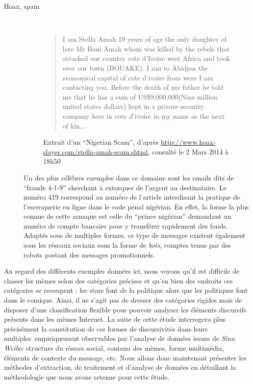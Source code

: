 \begin{description}
\item[Hoax, spam]
\hfill \\
\begin{figure}[ht]
    \begin{quote}
        I am Stella Amah 19 years of age the only daughter of late Mr Boni Amah whom was killed by the rebels that attacked our country cote d'Ivoire west Africa and took over our town (BOUAKE). I ran to Abidjan the economical capital of cote d'ivoire from were I am contacting you. Before the death of my father he told me that he has a sum of US\$9,000,000(Nine million united states dollars) kept in a private security company here in cote d'ivoire in my name as the next of kin... 
    \end{quote}
    \caption[Extrait d'un spam du type \textit{Nigerian Scam}]{
        Extrait d{\textquoteright}un {\textquotedblleft}Nigerian Scam{\textquotedblright}, d{\textquoteright}apr\`es \url{http://www.hoax-slayer.com/stella-amah-scam.shtml,} consult\'e le 2 Mars 2014 \`a 18h50
    }
    \label{fig:nigerian-scam}
\end{figure}

Un des plus c\'el\`ebres exemples dans ce domaine sont les emails dits de {\textquotedblleft}fraude 4-1-9{\textquotedblright} cherchant \`a extorquer de l{\textquoteright}argent au destinataire. Le num\'ero 419 correspond au num\'ero de l{\textquoteright}article interdisant la pratique de l{\textquoteright}escroquerie en ligne dans le code p\'enal nig\'erian. En effet, la forme la plus connue de cette arnaque est celle du {\textquotedblleft}prince nig\'erian{\textquotedblright} demandant un num\'ero de compte bancaire pour y transf\'erer rapidement des fonds. Adapt\'es sous de multiples formes, ce type de messages existent \'egalement sous les r\'eseaux sociaux sous la forme de \textit{bots}, comptes tenus par des robots postant des messages promotionnels.  


\end{description}

Au regard des diff\'erents exemples donn\'ees ici, nous voyons qu{\textquoteright}il est difficile de classer les m\`emes selon des cat\'egories pr\'ecises et qu{\textquoteright}en bien des endroits ces cat\'egories se recoupent : les stars font de la politique alors que les politiques font dans le comique. Ainsi, il ne s{\textquoteright}agit pas de dresser des cat\'egories rigides mais de disposer d{\textquoteright}une classification flexible pour pouvoir analyser les \'el\'ements discursifs pr\'esents dans les m\`emes Internet. La suite de cette \'etude interrogera plus pr\'ecis\'ement la constitution de ces formes de discursivit\'es dans leurs multiples~empiriquement observables par l{\textquoteright}analyse de donn\'ees issues de \textit{Sina Weibo}: structure du r\'eseau social, contenu des m\`emes, forme multim\'edia, \'el\'ements de contexte du message, etc. Nous allons donc maintenant pr\'esenter les m\'ethodes d{\textquoteright}extraction, de traitement et d{\textquoteright}analyse de donn\'ees en d\'etaillant la m\'ethodologie que nous avons retenue pour cette \'etude.